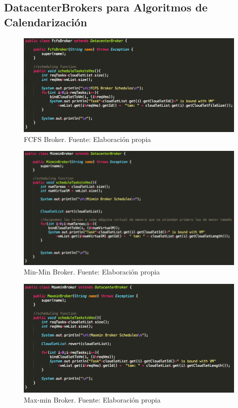 


\subsection*{DatacenterBrokers para Algoritmos de Calendarización}


\begin{figure}
	\caption{FCFS Broker. Fuente: Elaboración propia}
	\centering
	\includegraphics[scale=0.5]{media/FCFS_broker}
\end{figure}



\begin{figure}[h]
	\caption{Min-Min Broker. Fuente: Elaboración propia}
	\centering
	\includegraphics[scale=0.5]{media/minmin_broker}
\end{figure}

\begin{figure}[h]
	\caption{Max-min Broker. Fuente: Elaboración propia}
	\centering
	\includegraphics[scale=0.5]{media/maxmin_broker}
\end{figure}


